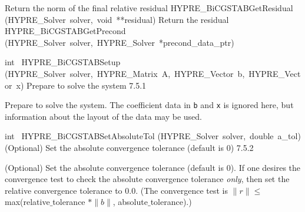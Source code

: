 \documentclass{article}
\begin{document}
\begin{cxxentry}
\begin{cxxentry}
\begin{cxxnames}
        {
Return the norm of the final relative residual}
        {}
\label{cxx.7.5.10}
        {HYPRE\_BiCGSTABGetResidual}
        {(HYPRE\_Solver\ solver,\ void\ **residual)}
        {
Return the residual}
        {}
\label{cxx.7.5.11}
        {HYPRE\_BiCGSTABGetPrecond}
        {(HYPRE\_Solver\ solver,\ HYPRE\_Solver\ *precond\_data\_ptr)}
        {}
        {}
\label{cxx.7.5.12}
\end{cxxnames}
\begin{cxxfunction}
{int\ }
        {HYPRE\_BiCGSTABSetup}
        {(HYPRE\_Solver\ solver,\ HYPRE\_Matrix\ A,\ HYPRE\_Vector\ b,\ HYPRE\_Vector\ x)}
        {
Prepare to solve the system}
        {7.5.1}
\begin{cxxdoc}

Prepare to solve the system.  The coefficient data in {\tt b} and {\tt x} is
ignored here, but information about the layout of the data may be used.
\end{cxxdoc}
\end{cxxfunction}
\begin{cxxfunction}
{int\ }
        {HYPRE\_BiCGSTABSetAbsoluteTol}
        {(HYPRE\_Solver\ solver,\ double\ a\_tol)}
        {
(Optional) Set the absolute convergence tolerance (default is 0)}
        {7.5.2}
\begin{cxxdoc}

(Optional) Set the absolute convergence tolerance (default is 0). 
If one desires
the convergence test to check the absolute convergence tolerance {\it only}, then
set the relative convergence tolerance to 0.0.  (The convergence test is 
$\|r\| \leq$ max(relative$\_$tolerance $\ast \|b\|$, absolute$\_$tolerance).)


\end{cxxdoc}
\end{cxxfunction}
\end{cxxentry}
\end{cxxentry}
\end{document}
